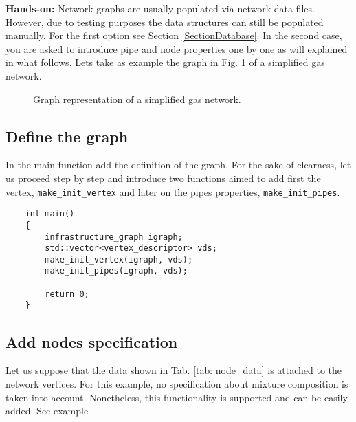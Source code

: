     

\textbf{Hands-on:}
Network graphs are usually populated via network data files. However, due to testing purposes  the data structures can still be populated manually. For the first option see Section \ref{SectionDatabase}. In the second case, you are asked to introduce pipe and node properties one by one as will explained in what follows. Lets take as example the graph in Fig. \ref{fig: graph_example} of a simplified  gas network. 

\begin{figure}[H]
    \centering
                
    \caption{Graph representation of a simplified gas network.}
    \label{fig: graph_example}
\end{figure}

\subsection{Define the graph}
In the main function add the definition of the graph. For the sake of clearness, let us proceed step by step and introduce two functions aimed to add first the vertex, \texttt{make\_init\_vertex} and later on the pipes properties, \texttt{make\_init\_pipes}. 

\begin{verbatim}
    int main()
    {
        infrastructure_graph igraph;
        std::vector<vertex_descriptor> vds;
        make_init_vertex(igraph, vds);
        make_init_pipes(igraph, vds);
    
        return 0; 
    }
\end{verbatim}   


\subsection{Add nodes specification}
Let us suppose that the data shown in Tab. \ref{tab: node_data} is attached to the network vertices. For this example, no specification about mixture composition is  taken into account. Nonetheless, this functionality is supported and can be easily added. See example 

